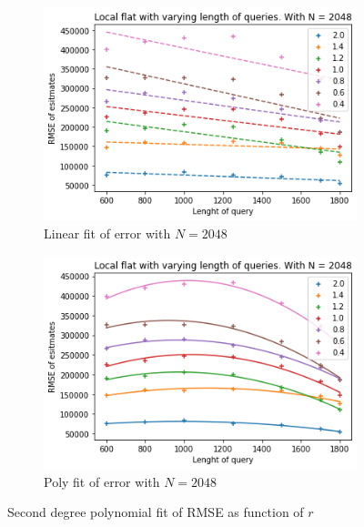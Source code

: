 \documentclass[11pt]{article}
\theoremstyle{definition}
\begin{document}
\begin{figure}[H]
\centering
\begin{subfigure}{.4\textwidth}
  \centering
  \includegraphics[width=\linewidth]{figures/local_flat/varying_r/loc_flat_varying_length_N_linear_=2048.png}
  \caption{Linear fit of error with $N=2048$}
  \label{fig:loc_r_sub2_lin}
\end{subfigure}%
\begin{subfigure}{.4\textwidth}
  \centering
  \includegraphics[width=\linewidth]{figures/local_flat/varying_r/loc_flat_varying_length_N_poly_=2048.png}
  \caption{Poly fit of error with $N=2048$ }
  \label{fig:loc_r_sub2_poly}
\end{subfigure}
\caption{Second degree polynomial fit of RMSE as function of $r$}
\label{fig:plt_loc_r_lin_poly_2}
\end{figure}
\end{document}
